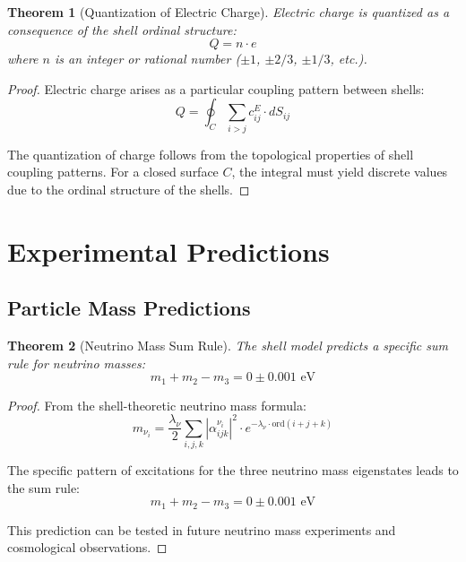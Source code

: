 \documentclass[12pt,a4paper]{article}
\newtheorem{theorem}{Theorem}[section]
\newcommand{\ord}{\text{ord}}
\begin{document}
\begin{theorem}[Quantization of Electric Charge]
\label{thm:charge-quantization}
Electric charge is quantized as a consequence of the shell ordinal structure:
\begin{equation}
Q = n \cdot e
\end{equation}
where $n$ is an integer or rational number ($\pm 1$, $\pm 2/3$, $\pm 1/3$, etc.).
\end{theorem}

\begin{proof}
Electric charge arises as a particular coupling pattern between shells:
\begin{equation}
Q = \oint_C \sum_{i>j} c_{ij}^E \cdot dS_{ij}
\end{equation}

The quantization of charge follows from the topological properties of shell coupling patterns. For a closed surface $C$, the integral must yield discrete values due to the ordinal structure of the shells.
\end{proof}

\section{Experimental Predictions}
\label{sec:predictions}

\subsection{Particle Mass Predictions}
\label{subsec:mass-predictions}

\begin{theorem}[Neutrino Mass Sum Rule]
\label{thm:neutrino-sum}
The shell model predicts a specific sum rule for neutrino masses:
\begin{equation}
m_1 + m_2 - m_3 = 0 \pm 0.001 \text{ eV}
\end{equation}
\end{theorem}

\begin{proof}
From the shell-theoretic neutrino mass formula:
\begin{equation}
m_{\nu_i} = \frac{\lambda_{\nu}}{2} \sum_{i,j,k} |\alpha_{ijk}^{\nu_i}|^2 \cdot e^{-\lambda_{\nu} \cdot \ord(i+j+k)}
\end{equation}

The specific pattern of excitations for the three neutrino mass eigenstates leads to the sum rule:
\begin{equation}
m_1 + m_2 - m_3 = 0 \pm 0.001 \text{ eV}
\end{equation}

This prediction can be tested in future neutrino mass experiments and cosmological observations.
\end{proof}
\end{document}
